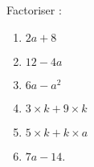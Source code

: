 
\begin{exercice}\label{exosmath-0983}

    Factoriser :
    \begin{multicols}{2}
        \begin{enumerate}
            \item
                \( 2a+8\)
            \item
                \( 12-4a\)
            \item
                \( 6a-a^2\)
            \item
                \( 3\times k+9\times k\)
            \item
                \( 5\times k+k\times a\)
            \item
                \( 7a-14\).
        \end{enumerate}
    \end{multicols}

\end{exercice}
